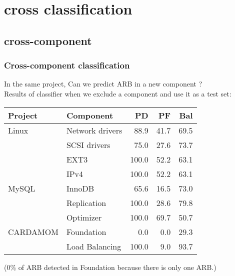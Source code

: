 \section{cross classification}

\subsection{cross-component}
\begin{frame}
 \frametitle{Cross-component classification}
 \alert{In the same project, Can we predict ARB in a new component ?}\\
 Results of classifier when we exclude a component and use it as a test set:
 \begin{center}
  \begin{tabular}{l l|r r r}
   Project & Component & PD & PF & Bal\\
   \hline
   Linux & Network drivers & 88.9 & 41.7 & 69.5\\
    & SCSI drivers & 75.0 & 27.6 & 73.7\\
    & EXT3 & 100.0 & 52.2 & 63.1\\
    & IPv4 & 100.0 & 52.2 & 63.1\\
   \hline
   MySQL & InnoDB & 65.6 & 16.5 & 73.0\\
    & Replication & 100.0 & 28.6 & 79.8\\
    & Optimizer & 100.0 & 69.7 & 50.7\\
   \hline
   CARDAMOM & Foundation & 0.0 & 0.0 & 29.3\\
    & Load Balancing & 100.0 & 9.0 & 93.7\\
   \hline
  \end{tabular}
 \end{center}
 \small (0\% of ARB detected in Foundation because there is only one ARB.) \normalsize
\end{frame}

